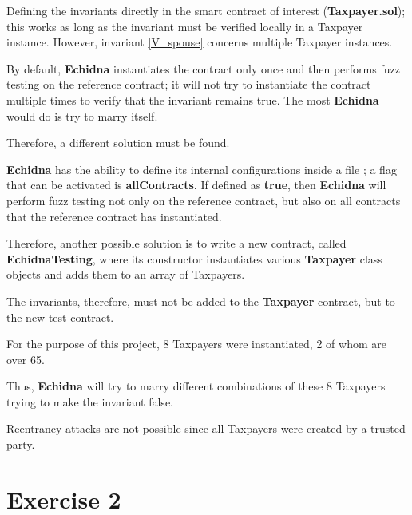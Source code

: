 \documentclass[conference]{IEEEtran}
\begin{document}
Defining the invariants directly in the smart contract of interest (\textbf{Taxpayer.sol}); this works as long as the invariant
must be verified locally in a Taxpayer instance.
However, invariant \ref{V_spouse} concerns multiple Taxpayer instances.

By default, \textbf{Echidna} instantiates the contract only once and then performs fuzz testing on the reference contract; it
will not try to instantiate the contract multiple times to verify that the invariant remains true. The most \textbf{Echidna} would do
is try to marry itself.

Therefore, a different solution must be found.

\textbf{Echidna} has the ability to define its internal configurations inside a  file
; a flag that can be activated is \textbf{allContracts}. If defined as \textbf{true}, then \textbf{Echidna} will perform fuzz testing not only
on the reference contract, but also on all contracts that the reference contract has instantiated.

Therefore, another possible solution is to write a new contract, called \textbf{EchidnaTesting}, where its constructor
instantiates various \textbf{Taxpayer} class objects and adds them to an array of Taxpayers.

The invariants, therefore, must not be added to the \textbf{Taxpayer} contract, but to the new test contract.

For the purpose of this project, 8 Taxpayers were instantiated, 2 of whom are over 65.

Thus, \textbf{Echidna} will try to marry different combinations of these 8 Taxpayers trying to make the invariant false.

Reentrancy attacks are not possible since all Taxpayers were created by a trusted party.


\section{Exercise 2}
\end{document}
